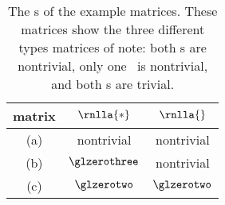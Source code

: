 \begin{table}[htdp]
\caption[The \ns s of the example matrices]{The \ns s of the example matrices. These matrices show the three different types matrices of note: both \ns s are nontrivial,  only one \ns \ is nontrivial, and both \ns s are trivial. }
\begin{center}
\begin{tabular}{ccc}
%
 matrix & $\rnlla{*}$ & $\rnlla{}$ \\\hline
%
 (a) & nontrivial & nontrivial \\
%
 (b) & $\glzerothree$ & nontrivial \\
%
 (c) & $\glzerotwo$ & $\glzerotwo$
%
\end{tabular}
\end{center}
\label{tab:ftola:null spaces}
\end{table}%


\endinput